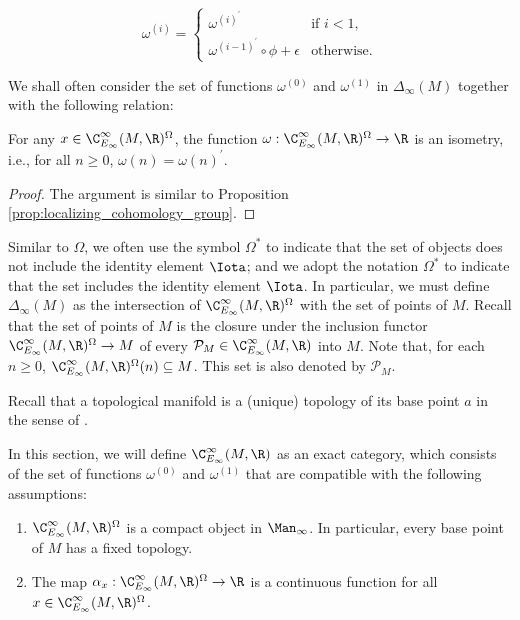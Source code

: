 \documentclass[a4paper,reqno,oneside]{article}
\begin{document}
\[
    \omega^{(i)} = \begin{cases}
        \omega^{(i)}^\prime & \text{if } i < 1, \\
        \omega^{(i-1)}^\prime \circ \phi + \epsilon & \text{otherwise.}
    \end{cases}
\]

We shall often consider the set of functions $\omega^{(0)}$ and $\omega^{(1)}$ in $\Delta_{\infty}(M)$ together with the following relation:

\begin{theorem}
    For any $x \in \C^{\infty}_{E_\infty}(M, \R)^{\Omega}$, the function $\omega: \C^{\infty}_{E_\infty}(M, \R)^{\Omega} \to \R$ is an isometry, i.e., for all $n \ge 0$, $\omega(n) = \omega(n)^\prime$.
\end{theorem}

\begin{proof}
    The argument is similar to Proposition \ref{prop:localizing_cohomology_group}.
\end{proof}

Similar to $\Omega$, we often use the symbol $\Omega^*$ to indicate that the set of objects does not include the identity element $\Iota$; and we adopt the notation $\Omega^*$ to indicate that the set includes the identity element $\Iota$. In particular, we must define $\Delta_{\infty}(M)$ as the intersection of $\C^{\infty}_{E_\infty}(M, \R)^{\Omega}$ with the set of points of $M$. Recall that the set of points of $M$ is the closure under the inclusion functor $\C^{\infty}_{E_\infty}(M, \R)^{\Omega} \to M$ of every $\mathcal{P}_M \in \C^{\infty}_{E_\infty}(M, \R)$ into $M$. Note that, for each $n \ge 0$, $\C^{\infty}_{E_\infty}(M, \R)^{\Omega}(n) \subseteq M$. This set is also denoted by $\mathcal{P}_M$. 

Recall that a topological manifold is a (unique) topology of its base point $a$ in the sense of \cite[Definition 1.4]{BourkeWilliamson1984}.

In this section, we will define $\C^{\infty}_{E_\infty}(M, \R)$ as an exact category, which consists of the set of functions $\omega^{(0)}$ and $\omega^{(1)}$ that are compatible with the following assumptions:

\begin{enumerate}
    \item $\C^{\infty}_{E_\infty}(M, \R)^{\Omega}$ is a compact object in $\Man_{\infty}$. In particular, every base point of $M$ has a fixed topology.
    
    \item The map $\alpha_x: \C^{\infty}_{E_\infty}(M, \R)^{\Omega} \to \R$ is a continuous function for all $x \in \C^{\infty}_{E_\infty}(M, \R)^{\Omega}$.
\end{enumerate}
\end{document}
